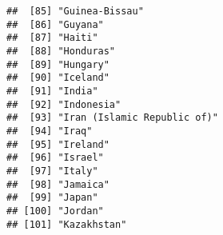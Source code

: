 \documentclass[
]{article}
\begin{document}
\begin{verbatim}
##  [85] "Guinea-Bissau"                                                                                                                                        
##  [86] "Guyana"                                                                                                                                               
##  [87] "Haiti"                                                                                                                                                
##  [88] "Honduras"                                                                                                                                             
##  [89] "Hungary"                                                                                                                                              
##  [90] "Iceland"                                                                                                                                              
##  [91] "India"                                                                                                                                                
##  [92] "Indonesia"                                                                                                                                            
##  [93] "Iran (Islamic Republic of)"                                                                                                                           
##  [94] "Iraq"                                                                                                                                                 
##  [95] "Ireland"                                                                                                                                              
##  [96] "Israel"                                                                                                                                               
##  [97] "Italy"                                                                                                                                                
##  [98] "Jamaica"                                                                                                                                              
##  [99] "Japan"                                                                                                                                                
## [100] "Jordan"                                                                                                                                               
## [101] "Kazakhstan"                                                                                                                                           

\end{verbatim}
\end{document}
